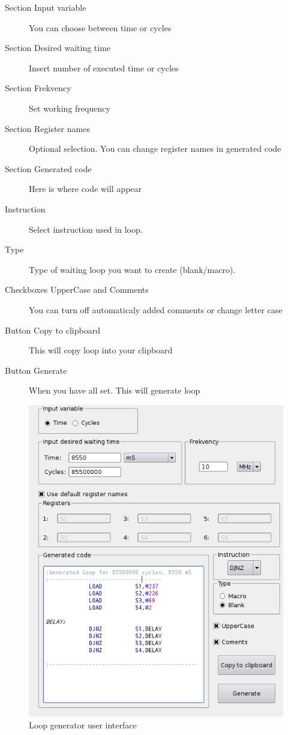     \begin{description}
        \item[Section Input variable] You can choose between time or cycles
        \item[Section Desired waiting time] Insert number of executed time or cycles 
        \item[Section Frekvency] Set working frequency 
        \item[Section Register names] Optional selection. You can change register names in generated code
        \item[Section Generated code] Here is where code will appear
        \item[Instruction] Select instruction used in loop.
        \item[Type] Type of waiting loop you want to create (blank/macro).
        \item[Checkboxes UpperCase and Comments]  You can turn off automaticaly added comments or change letter case
        \item[Button Copy to clipboard] This will copy loop into your clipboard
        \item[Button Generate] When you have all set. This will generate loop
    \end{description}

    \begin{figure}[h]
        \centering{}
        \includegraphics[width=.7\textwidth]{img/loop_gen.png}
        \caption{Loop generator user interface}
    \end{figure}


